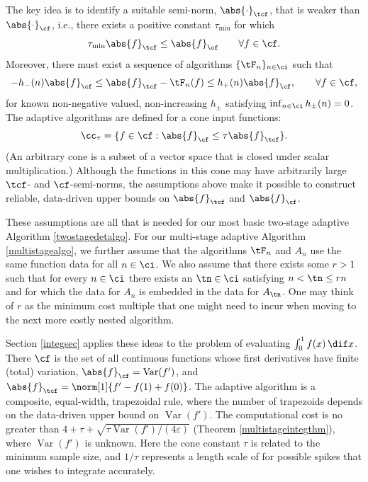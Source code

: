 \documentclass[]{elsarticle}
\DeclareMathOperator{\Var}{Var}
\theoremstyle{definition}
\theoremstyle{remark}
\newcommand{\Fnorm}[1]{\abs{#1}_{\cf}}
\newcommand{\Ftnorm}[1]{\abs{#1}_{\tcf}}
\begin{document}
The key idea is to identify a suitable semi-norm, $\Ftnorm{\cdot}$, that is weaker than $\Fnorm{\cdot}$, i.e., there exists a positive constant $\tau_{\min}$ for which 
\begin{equation} \label{Fspacecondstrong}
\tau_{\min} \Ftnorm{f} \le \Fnorm{f} \qquad \forall f \in \cf.
\end{equation}
Moreover, there must exist a sequence of algorithms $\{\tF_n\}_{n\in \ci}$ such that 
\begin{equation} \label{Gerrbds}
-h_{-}(n)\Fnorm{f} \le \Ftnorm{f}- \tF_n(f) \le h_{+}(n) \Fnorm{f}, \qquad \forall f \in \cf,
\end{equation}
for known non-negative valued, non-increasing $h_{\pm}$ satisfying $\inf_{n \in \ci} h_{\pm}(n) = 0$.  The adaptive algorithms are defined for a cone input functions:
\begin{equation} \label{conedef}
\cc_{\tau}=\{f \in \cf : \Fnorm{f} \le \tau \Ftnorm{f} \}.
\end{equation}
(An arbitrary cone is a subset of a vector space that is closed under scalar multiplication.) Although the functions in this cone may have arbitrarily large $\tcf$- and $\cf$-semi-norms, the assumptions above make it
possible to construct reliable, data-driven upper bounds on $\Ftnorm{f}$ and $\Fnorm{f}$. 

These assumptions are all that is needed for our most basic two-stage adaptive Algorithm \ref{twostagedetalgo}.  For our multi-stage adaptive Algorithm \ref{multistagealgo}, we further assume that the algorithms $\tF_n$ and $A_n$ use the same function data for all $n \in \ci$.  We also assume that there exists some $r>1$ such that for every $n \in \ci$ there exists an $\tn \in \ci$ satisfying $n < \tn \le rn$ and for which the data for $A_n$ is embedded in the data for $A_{\tn}$. One may think of $r$ as the minimum cost multiple that one might need to incur when moving to the next more costly nested algorithm.

Section \ref{integsec} applies these ideas to the problem of evaluating $\int_0^1 f(x) \, \dif x$.  There $\cf$ is the set of all continuous functions whose first derivatives have finite (total) variation, $\Fnorm{f}=\Var(f')$, and $\Ftnorm{f}=\norm[1]{f'-f(1)+f(0)}$.  The adaptive algorithm is a composite, equal-width, trapezoidal rule, where the number of trapezoids depends on the data-driven upper bound on $\Var(f')$.  The computational cost is no greater than $4+ \tau + \sqrt{\tau \Var(f')/(4\varepsilon)}$ (Theorem \ref{multistageintegthm}), where $\Var(f')$ is unknown. Here the cone constant $\tau$ is related to the minimum sample size, and $1/\tau$ represents a length scale of for possible spikes that one wishes to integrate accurately.
\end{document}
